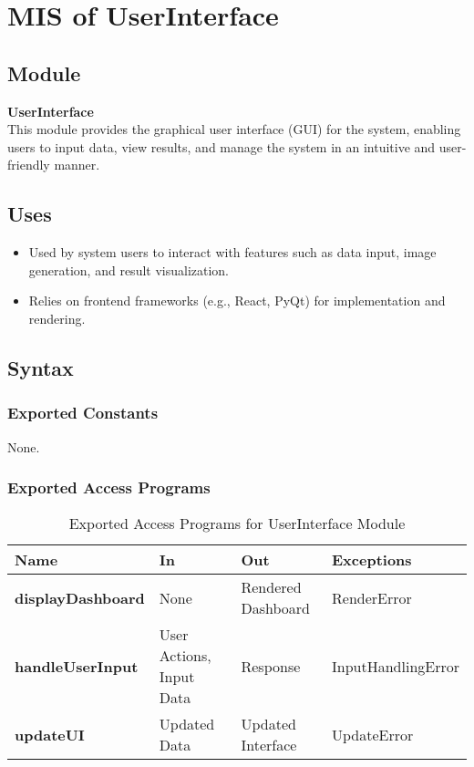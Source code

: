 \documentclass[12pt, titlepage]{article}
\begin{document}
\section{MIS of UserInterface}

\subsection{Module}
\textbf{UserInterface} \\
This module provides the graphical user interface (GUI) for the system, enabling users to input data, view results, and manage the system in an intuitive and user-friendly manner.

\subsection{Uses}
\begin{itemize}
    \item Used by system users to interact with features such as data input, image generation, and result visualization.
    \item Relies on frontend frameworks (e.g., React, PyQt) for implementation and rendering.
\end{itemize}

\subsection{Syntax}

\subsubsection{Exported Constants}
None.

\subsubsection{Exported Access Programs}

\begin{table}[h!]
\centering
\begin{tabular}{|p{4cm}|p{5cm}|p{5cm}|p{4cm}|}
    \hline
    \textbf{Name} & \textbf{In} & \textbf{Out} & \textbf{Exceptions} \\
    \hline
    \textbf{displayDashboard} & None & Rendered Dashboard & RenderError \\
    \hline
    \textbf{handleUserInput} & User Actions, Input Data & Response & InputHandlingError \\
    \hline
    \textbf{updateUI} & Updated Data & Updated Interface & UpdateError \\
    \hline
\end{tabular}
\caption{Exported Access Programs for UserInterface Module}
\label{table:userInterfaceModule}
\end{table}
\end{document}
